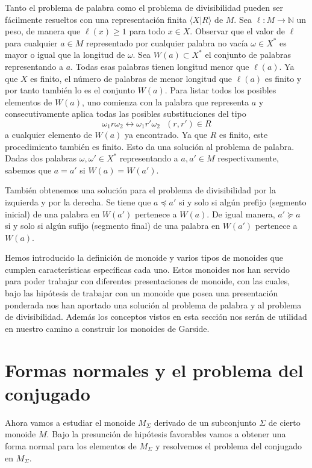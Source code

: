 \documentclass[12pt]{book}
\theoremstyle{definition}
\begin{document}
Tanto el problema de palabra como el problema de divisibilidad pueden ser fácilmente resueltos con una representación finita $\langle X|R\rangle$ de $M$. Sea $\ell:M\rightarrow\mathbb{N}$ un peso, de manera que $\ell(x)\geq 1$ para todo $x\in X$. Observar que el valor de $\ell$ para cualquier $a\in M$ representado por cualquier palabra no vacía $\omega\in X^*$ es mayor o igual que la longitud de $\omega$. Sea $W(a)\subset X^*$ el conjunto de palabras representando a $a$. Todas esas palabras tienen longitud menor que $\ell(a)$. Ya que $X$ es finito, el número de palabras de menor longitud que $\ell(a)$ es finito y por tanto también lo es el conjunto $W(a)$. Para listar todos los posibles elementos de $W(a)$, uno comienza con la palabra que representa $a$ y consecutivamente aplica todas las posibles substituciones del tipo
$$\omega_1 r\omega_2\leftrightarrow \omega_1 r'\omega_2\ \ \ (r,r')\in R$$
a cualquier elemento de $W(a)$ ya encontrado. Ya que $R$ es finito, este procedimiento también es finito. Esto da una solución al problema de palabra. Dadas dos palabras $\omega,\omega'\in X^*$ representando a $a,a'\in M$ respectivamente, sabemos que $a=a'$ si $W(a)=W(a')$.

También obtenemos una solución para el problema de divisibilidad por la izquierda y por la derecha. Se tiene que $a\preceq a'$ si y solo si algún prefijo (segmento inicial) de una palabra en $W(a')$ pertenece a $W(a)$. De igual manera, $a'\succeq a$ si y solo si algún sufijo (segmento final) de una palabra en $W(a')$ pertenece a $W(a)$.

Hemos introducido la definición de monoide y varios tipos de monoides que cumplen características específicas cada uno. Estos monoides nos han servido para poder trabajar con diferentes presentaciones de monoide, con las cuales, bajo las hipótesis de trabajar con un monoide que posea una presentación ponderada nos han aportado una solución al problema de palabra y al problema de divisibilidad. Además los conceptos vistos en esta sección nos serán de utilidad en nuestro camino a construir los monoides de Garside.

\section{Formas normales y el problema del conjugado}

Ahora vamos a estudiar el monoide $M_\Sigma$ derivado de un subconjunto $\Sigma$ de cierto monoide $M$. Bajo la presunción de hipótesis favorables vamos a obtener una forma normal para los elementos de $M_\Sigma$ y resolvemos el problema del conjugado en $M_\Sigma$.
\end{document}
